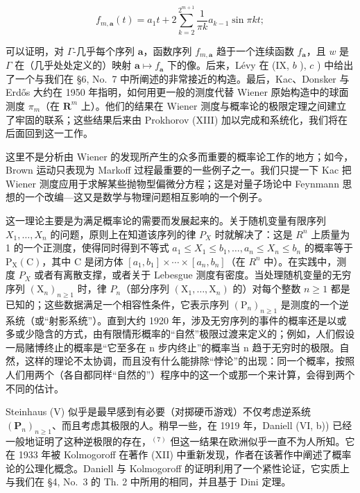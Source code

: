 \[
f _ {m, \mathbf {a}} (t) = a _ {1} t + 2 \sum_ {k = 2} ^ {2 ^ {m + 1}} \frac {1}{\pi k} a _ {k - 1} \sin \pi k t;
\]

可以证明，对 \(\Gamma\)-几乎每个序列 \(\mathbf{a}\)，函数序列 \(f_{m,\mathbf{a}}\) 趋于一个连续函数 \(f_{\mathbf{a}}\)，且 \(w\) 是 \(\Gamma\) 在（几乎处处定义的）映射 \(\mathbf{a} \mapsto f_{\mathbf{a}}\) 下的像。后来，Lévy 在 (IX, \(b\) ), \(c\) ) 中给出了一个与我们在 §6, No.~7 中所阐述的非常接近的构造。最后，Kac、Donsker 与 Erdős 大约在 1950 年指明，如何用更一般的测度代替 Wiener 原始构造中的球面测度 \(\pi_m\)（在 \(\mathbf{R}^m\) 上）。他们的结果在 Wiener 测度与概率论的极限定理之间建立了牢固的联系；这些结果后来由 Prokhorov (XIII) 加以完成和系统化，我们将在后面回到这一工作。

这里不是分析由 Wiener 的发现所产生的众多而重要的概率论工作的地方；如今，Brown 运动只表现为 Markoff 过程最重要的一些例子之一。我们只提一下 Kac 把 Wiener 测度应用于求解某些抛物型偏微分方程；这是对量子场论中 Feynmann 思想的一个改编---这又是数学与物理问题相互影响的一个例子。


这一理论主要是为满足概率论的需要而发展起来的。关于随机变量有限序列 \(X_{1},\ldots,X_{n}\) 的问题，原则上在知道该序列的律 \(P_{X}\) 时就解决了：这是 \(R^{n}\) 上质量为 1 的一个正测度，使得同时得到不等式 \(a_{1}\leqslant X_{1}\leqslant b_{1},\ldots,a_{n}\leqslant X_{n}\leqslant b_{n}\) 的概率等于 \(\mathrm{P}_{\mathrm{X}}(\mathrm{C})\)，其中 C 是闭方体 \([a_{1},b_{1}]\times\cdots\times[a_{n},b_{n}]\)（在 \(R^{n}\) 中）。在实践中，测度 \(P_{X}\) 或者有离散支撑，或者关于 Lebesgue 测度有密度。当处理随机变量的无穷序列 \((\mathrm{X}_{n})_{n\geqslant1}\) 时，律 \(P_{n}\)（部分序列 \((\mathrm{X}_{1},\ldots,\mathrm{X}_{n})\) 的）对每个整数 \(n\geqslant1\) 都是已知的；这些数据满足一个相容性条件，它表示序列 \((\mathrm{P}_{n})_{n\geqslant1}\) 是测度的一个逆系统（或“射影系统”）。直到大约 1920 年，涉及无穷序列的事件的概率还是以或多或少隐含的方式，由有限情形概率的“自然”极限过渡来定义的；例如，人们假设一局赌博终止的概率是“它至多在 n 步内终止”的概率当 n 趋于无穷时的极限。自然，这样的理论不太协调，而且没有什么能排除“悖论”的出现：同一个概率，按照人们用两个（各自都同样“自然的”）程序中的这一个或那一个来计算，会得到两个不同的估计。

Steinhaus (V) 似乎是最早感到有必要（对掷硬币游戏）不仅考虑逆系统 \((\mathbf{P}_{n})_{n\geqslant1}\)、而且考虑其极限的人。稍早一些，在 1919 年，Daniell (VI, b)) 已经一般地证明了这种逆极限的存在，\(^{(7)}\) 但这一结果在欧洲似乎一直不为人所知。它在 1933 年被 Kolmogoroff 在著作 (XII) 中重新发现，作者在该著作中阐述了概率论的公理化概念。Daniell 与 Kolmogoroff 的证明利用了一个紧性论证，它实质上与我们在 §4, No.~3 的 Th. 2 中所用的相同，并且基于 Dini 定理。

